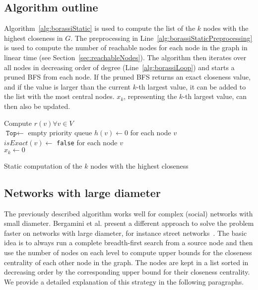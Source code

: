 \subsection{Algorithm outline}
Algorithm~\ref{alg:borassiStatic} is used to compute the list of the $k$ nodes with the highest closeness in $G$. The preprocessing in Line~\ref{alg:borassiStaticPreprocessing} is used to compute the number of reachable nodes for each node in the graph in linear time (see Section~\ref{sec:reachableNodes}). The algorithm then iterates over all nodes in decreasing order of degree (Line~\ref{alg:borassiLoop}) and starts a pruned BFS from each node. If the pruned BFS returns an exact closeness value, and if the value is larger than the current $k$-th largest value, it can be added to the list with the most central nodes. $x_k$, representing the $k$-th largest value, can then also be updated.


\begin{algorithm2e}[h!]
 \label{alg:borassiStatic}
 Compute $r(v) \forall v \in V$ \label{alg:borassiStaticPreprocessing}\\
 $\texttt{Top} \gets $ empty priority queue
 $h(v) \gets 0$ for each node $v$\\
 $isExact(v) \gets $ \texttt{false} for each node $v$\\
 $x_k \gets 0$\\

 \caption{Static computation of the $k$ nodes with the highest closeness}
\end{algorithm2e}

\subsection{Networks with large diameter}
\label{sec:largeDiameterStatic}
The previously described algorithm works well for complex (social) networks with small diameter. Bergamini et al. present a different approach to solve the problem faster on networks with large diameter, for instance street networks~\cite{bergamini2016computing}. The basic idea is to always run a complete breadth-first search from a source node and then use the number of nodes on each level to compute upper bounds for the closeness centrality of each other node in the graph. The nodes are kept in a list sorted in decreasing order by the corresponding upper bound for their closeness centrality. We provide a detailed explanation of this strategy in the following paragraphs. 


